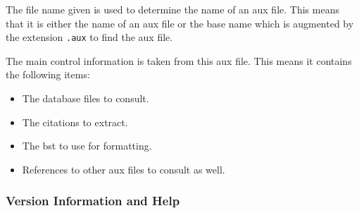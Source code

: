 The file name given is used to determine the name of an aux file. This
means that it is either the name of an aux file or the base name which
is augmented by the extension \texttt{.aux} to find the aux file.

The main control information is taken from this aux file. This means
it contains the following items:

\begin{itemize}
\item The database files to consult.
\item The citations to extract.
\item The bst to use for formatting.
\item References to other aux files to consult as well.
\end{itemize}

\subsubsection{Version Information and Help}

